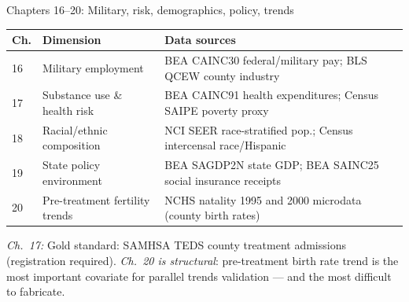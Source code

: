 \documentclass[aspectratio=169,12pt]{beamer}
\begin{document}
\begin{frame}{Chapters 16--20: Military, risk, demographics, policy, trends}

\vspace{0.2em}
{\scriptsize\setlength{\tabcolsep}{4pt}%
\begin{tabular}{@{}p{}p{}p{}@{}}
\toprule
\textbf{Ch.} & \textbf{Dimension} & \textbf{Data sources} \\
\midrule
16 & Military employment
   & BEA CAINC30 federal/military pay; BLS QCEW county industry \\[1pt]
17 & Substance use \& health risk
   & BEA CAINC91 health expenditures; Census SAIPE poverty proxy \\[1pt]
18 & Racial/ethnic composition
   & NCI SEER race-stratified pop.; Census intercensal race/Hispanic \\[1pt]
19 & State policy environment
   & BEA SAGDP2N state GDP; BEA SAINC25 social insurance receipts \\[1pt]
20 & Pre-treatment fertility trends
   & NCHS natality 1995 and 2000 microdata (county birth rates) \\
\bottomrule
\end{tabular}%
}

\vspace{0.25em}
{\scriptsize\color{OldMortar}\raggedright
\textit{Ch.\ 17:} Gold standard: SAMHSA TEDS county treatment admissions (registration required).\quad
\textit{Ch.\ 20 is structural}: pre-treatment birth rate trend is the most important covariate
for parallel trends validation --- and the most difficult to fabricate.\par}

\end{frame}
\end{document}
